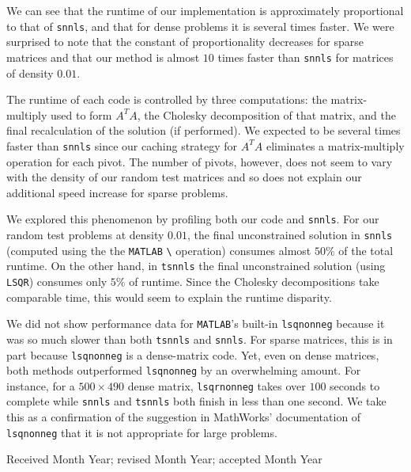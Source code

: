\documentclass[acmtoms,acmnow,aps,floatfix]{acmtrans2m}
\newcommand{\tsnnls}{\texttt{tsnnls} }
\newcommand{\snnls}{\texttt{snnls} }
\begin{document}
We can see that the runtime of our implementation is approximately proportional to that of \texttt{snnls}, and that for dense problems it is several times faster. We were surprised to note that the constant of proportionality decreases for sparse matrices and that our method is almost $10$ times faster than \snnls for matrices of density $0.01$. 

The runtime of each code is controlled by three computations: the matrix-multiply used to form $A^T\!A$, the Cholesky decomposition of that matrix, and the final recalculation of the solution (if performed). We expected to be several times faster than \snnls since our caching strategy for $A^T\!A$ eliminates a matrix-multiply operation for each pivot. The number of pivots, however, does not seem to vary with the density of our random test matrices and so does not explain our additional speed increase for sparse problems.

We explored this phenomenon by profiling both our code and \texttt{snnls}. For our random test problems at density $0.01$, the final unconstrained solution in \snnls (computed using the the \texttt{MATLAB} \verb=\= operation) consumes almost $50\%$ of the total runtime. On the other hand, in \tsnnls the final unconstrained solution (using \texttt{LSQR}) consumes only $5\%$ of runtime. Since the Cholesky decompositions take comparable time, this would seem to explain the runtime disparity.

We did not show performance data for \texttt{MATLAB}'s built-in \texttt{lsqnonneg} because it was so much slower than both \tsnnls and \texttt{snnls}. For sparse matrices, this is in part because \texttt{lsqnonneg} is a dense-matrix code. Yet, even on dense matrices, both methods outperformed \texttt{lsqnonneg} by an overwhelming amount. For instance, for a $500 \times 490$ dense matrix, \texttt{lsqrnonneg} takes over $100$ seconds to complete while \snnls and \tsnnls both finish in less than one second. We take this as a confirmation of the suggestion in MathWorks' documentation of \texttt{lsqnonneg} that it is not appropriate for large problems.



 
\vspace{-3ex}

\begin{received}
Received Month Year; revised Month Year; accepted Month Year
\end{received}
\end{document}
